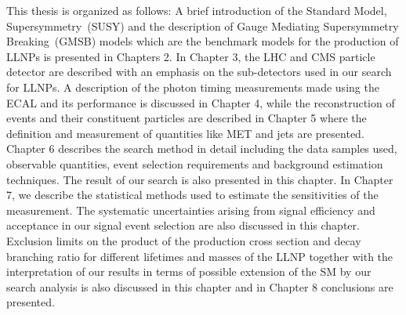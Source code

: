 \par
This thesis is organized as follows: A brief introduction of the Standard Model, Supersymmetry~(SUSY) and the description of Gauge Mediating Supersymmetry Breaking~(GMSB) models which are the benchmark models for the production of LLNPs \cite{GMSB} is presented in Chapters 2.  In Chapter 3, the LHC and CMS particle detector are described with an emphasis on the sub-detectors used in our search for LLNPs. A description of the photon timing measurements made using the ECAL and its performance is discussed in Chapter 4, while the reconstruction  of events and their constituent particles are described in Chapter 5 where the definition and measurement of quantities like MET and jets are presented. Chapter 6 describes the search method in detail including the data samples used, observable quantities, event selection requirements and background estimation techniques. The result of our search is also presented in this chapter. In Chapter 7, we describe the statistical methods used to estimate the sensitivities of the measurement. The systematic uncertainties arising from signal efficiency and acceptance in our signal event selection are also discussed in this chapter. Exclusion limits on the product of the production cross section and decay branching ratio for different lifetimes and masses of the LLNP together with the interpretation of our results in terms of possible extension of the SM by our search analysis is also discussed in this chapter and in Chapter 8 conclusions are presented.
\label{intro_chapter}
